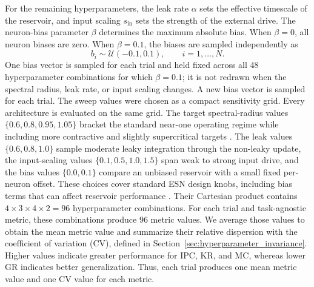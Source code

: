 \documentclass[a4paper,fleqn]{style_neural_networks/cas-dc}
\let\parencite\citep
\begin{document}
For the remaining hyperparameters, the leak rate \(\alpha\) sets the
effective timescale of the reservoir, and input scaling
\(s_{\mathrm{in}}\) sets the strength of the external drive. The
neuron-bias parameter \(\beta\) determines the maximum absolute bias.
When \(\beta=0\), all neuron biases are zero. When \(\beta=0.1\), the
biases are sampled independently as
\[
b_i\sim\mathcal{U}(-0.1,0.1),
\qquad i=1,\ldots,N.
\]
One bias vector is sampled for each trial and held fixed across all 48
hyperparameter combinations for which \(\beta=0.1\); it is not redrawn
when the spectral radius, leak rate, or input scaling changes. A new
bias vector is sampled for each trial.
The sweep values were chosen as a compact sensitivity grid. Every architecture is evaluated on the same grid. The target spectral-radius values \(\{0.6,0.8,0.95,1.05\}\) bracket the standard near-one operating regime while including more contractive and slightly supercritical targets \parencite{Lukosevicius2012PracticalESN,gallicchio_chasing_2019}. The leak values \(\{0.6,0.8,1.0\}\) sample moderate leaky integration through the non-leaky update, the input-scaling values \(\{0.1,0.5,1.0,1.5\}\) span weak to strong input drive, and the bias values \(\{0.0,0.1\}\) compare an unbiased reservoir with a small fixed per-neuron offset. These choices cover standard ESN design knobs, including bias terms that can affect reservoir performance \parencite{Lukosevicius2012PracticalESN,platt_systematic_2022,Matzner2022HyperparameterTuningESN}. Their Cartesian product contains \(4\times3\times4\times2=96\) hyperparameter combinations. For each trial and task-agnostic metric, these combinations produce 96 metric values. We average those values to obtain the mean metric value and summarize their relative dispersion with the coefficient of variation (CV), defined in Section~\ref{sec:hyperparameter_invariance}. Higher values indicate greater performance for IPC, KR, and MC, whereas lower GR indicates better generalization. Thus, each trial produces one mean metric value and one CV value for each metric.
\end{document}
